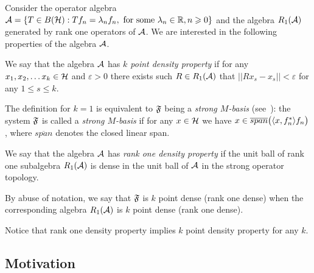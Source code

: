 \documentclass[12pt]{amsart}
\theoremstyle{case}
\begin{document}
    Consider the operator algebra $\cal{A} = \{T\in B(\cal{H}): Tf_n = \lambda_n f_n, \text{ for some } \lambda_n \in \mathbb{R}, n \geq 0\}$
      and the algebra $R_1(\cal{A})$ generated by rank one operators of $\cal{A}$.
    We are interested in the following properties of the algebra $\cal{A}$.
    \begin{definition}
      \label{kpd}
      We say that the algebra $\cal{A}$ has \emph{$k$ point density property} if for any $x_1, x_2,\dots x_k \in \cal{H}$ and $\varepsilon > 0$
        there exists such $R\in R_1(\cal{A})$ that $||Rx_s - x_s|| < \varepsilon$ for any $1 \leq s \leq k$.
    \end{definition}
    The definition for $k=1$ is equivalent to $\fsys$ being a \emph{strong $M$-basis} (see~\cite{katavolos}):
      the system $\fsys$ is called a \emph{strong $M$-basis} if for any $x\in\cal{H}$ we have $x \in \overline{span}\big(\inner{x}{f^*_n}f_n\big)$, where
      $\overline{span}$ denotes the closed linear span.
    \begin{definition}
      \label{r1d}
      We say that the algebra $\cal{A}$ has \emph{rank one density property} if the unit ball of rank one subalgebra $R_1(\cal{A})$
        is dense in the unit ball of $\cal{A}$ in the strong operator topology.
    \end{definition}
    By abuse of notation, we say that $\fsys$ is $k$ point dense (rank one dense)
      when the corresponding algebra $R_1(\cal{A})$ is $k$ point dense (rank one dense).

    Notice that rank one density property implies $k$ point density property for any $k$.

  \subsection{Motivation}
\end{document}
